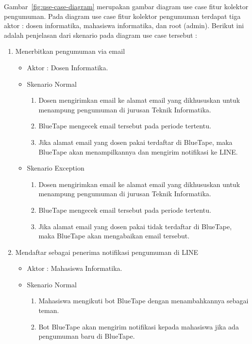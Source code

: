Gambar~\ref{fig:use-case-diagram} merupakan gambar diagram use case fitur kolektor pengumuman. Pada diagram use case fitur kolektor pengumuman terdapat tiga aktor : dosen informatika, mahasiswa informatika, dan root (admin). Berikut ini adalah penjelasan dari skenario pada diagram use case tersebut :
\begin{enumerate}
\item Menerbitkan pengumuman via email

\begin{itemize}
	\item Aktor : Dosen Informatika.
	\item Skenario Normal

	\begin{enumerate}
		\item Dosen mengirimkan email ke alamat email yang dikhususkan untuk menampung pengumuman di jurusan Teknik Informatika.
		\item BlueTape mengecek email tersebut pada periode tertentu.
		\item Jika alamat email yang dosen pakai terdaftar di BlueTape, maka BlueTape akan menampilkannya dan mengirim notifikasi ke LINE.
	\end{enumerate}
	
	\item Skenario Exception
	\begin{enumerate}
		\item Dosen mengirimkan email ke alamat email yang dikhususkan untuk menampung pengumuman di jurusan Teknik Informatika.
		\item BlueTape mengecek email tersebut pada periode tertentu.
		\item Jika alamat email yang dosen pakai tidak terdaftar di BlueTape, maka BlueTape akan mengabaikan email tersebut.
	\end{enumerate}
\end{itemize}

\item Mendaftar sebagai penerima notifikasi pengumuman di LINE

\begin{itemize}
	\item Aktor : Mahasiswa Informatika.
	\item Skenario Normal

	\begin{enumerate}
		\item Mahasiswa mengikuti bot BlueTape dengan menambahkannya sebagai teman.
		\item Bot BlueTape akan mengirim notifikasi kepada mahasiswa jika ada pengumuman baru di BlueTape.
	\end{enumerate}
\end{itemize}


\end{enumerate}
